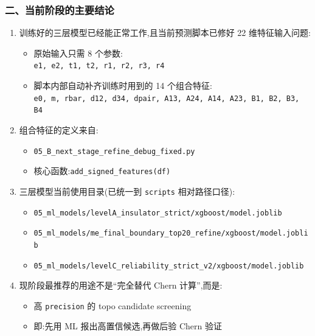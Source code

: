 \documentclass[lang=cn,scheme=chinese,color=blue,device=normal,toc=onecol,math=cm]{elegantbook}
\begin{document}
\subsubsection{二、当前阶段的主要结论}


\begin{enumerate}
\item 训练好的三层模型已经能正常工作,且当前预测脚本已修好 22 维特征输入问题: 
\begin{itemize}
\item 原始输入只需 8 个参数:\\ \texttt{e1, e2, t1, t2, r1, r2, r3, r4}
\item 脚本内部自动补齐训练时用到的 14 个组合特征:\\ \texttt{e0, m, rbar, d12, d34, dpair, A13, A24, A14, A23, B1, B2, B3, B4}
\end{itemize}
\item 组合特征的定义来自: 
\begin{itemize}
\item \texttt{05\_\allowbreak{}B\_\allowbreak{}next\_\allowbreak{}stage\_\allowbreak{}refine\_\allowbreak{}debug\_\allowbreak{}fixed.py}
\item 核心函数:\texttt{add\_\allowbreak{}signed\_\allowbreak{}features(df)}
\end{itemize}
\item 三层模型当前使用目录(已统一到 \texttt{scripts} 相对路径口径): 
\begin{itemize}
\item \texttt{05\_\allowbreak{}ml\_\allowbreak{}models/\allowbreak{}levelA\_\allowbreak{}insulator\_\allowbreak{}strict/\allowbreak{}xgboost/\allowbreak{}model.joblib}
\item \texttt{05\_\allowbreak{}ml\_\allowbreak{}models/\allowbreak{}me\_\allowbreak{}final\_\allowbreak{}boundary\_\allowbreak{}top20\_\allowbreak{}refine/\allowbreak{}xgboost/\allowbreak{}model.joblib}
\item \texttt{05\_\allowbreak{}ml\_\allowbreak{}models/\allowbreak{}levelC\_\allowbreak{}reliability\_\allowbreak{}strict\_\allowbreak{}v2/\allowbreak{}xgboost/\allowbreak{}model.joblib}
\end{itemize}
\item 现阶段最推荐的用途不是“完全替代 Chern 计算”,而是: 
\begin{itemize}
\item 高 \texttt{precision} 的 topo candidate screening
\item 即:先用 ML 报出高置信候选,再做后验 Chern 验证
\end{itemize}

\end{enumerate}
\end{document}
